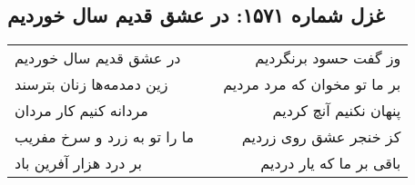 \begin{center}
\section*{غزل شماره ۱۵۷۱: در عشق قدیم سال خوردیم}
\label{sec:1571}
\begin{longtable}{l p{0.5cm} r}
در عشق قدیم سال خوردیم
&&
وز گفت حسود برنگردیم
\\
زین دمدمه‌ها زنان بترسند
&&
بر ما تو مخوان که مرد مردیم
\\
مردانه کنیم کار مردان
&&
پنهان نکنیم آنچ کردیم
\\
ما را تو به زرد و سرخ مفریب
&&
کز خنجر عشق روی زردیم
\\
بر درد هزار آفرین باد
&&
باقی بر ما که یار دردیم
\\
\end{longtable}
\end{center}

